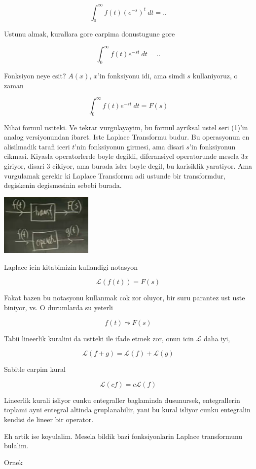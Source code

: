 \documentclass[12pt,fleqn]{article}
\begin{document}
\[ \int_0^{\infty} f(t)(e^{-s})^t \ dt = ..\]

Ustunu almak, kurallara gore carpima donustugune gore

\[ \int_0^{\infty} f(t)e^{-st} \ dt = ..\]

Fonksiyon neye esit? $A(x)$, $x$'in fonksiyonu idi, ama simdi $s$
kullaniyoruz, o zaman 

\[ \int_0^{\infty} f(t)e^{-st} \ dt = F(s)\]

Nihai formul ustteki. Ve tekrar vurgulayayim, bu formul ayriksal ustel seri
(1)'in analog versiyonundan ibaret. Iste Laplace Transformu budur. Bu
operasyonun en alisilmadik tarafi iceri $t$'nin fonksiyonun girmesi, ama
disari $s$'in fonksiyonun cikmasi. Kiyasla operatorlerde boyle degildi,
diferansiyel operatorunde mesela $3x$ giriyor, disari $3$ cikiyor, ama
burada isler boyle degil, bu karisiklik yaratiyor. Ama vurgulamak gerekir
ki Laplace Transformu adi ustunde bir transformdur, degiskenin degismesinin
sebebi burada. 

\includegraphics[height=3cm]{19_1.png}

Laplace icin kitabimizin kullandigi notasyon 

\[ \mathcal{L}(f(t)) = F(s) \]

Fakat bazen bu notasyonu kullanmak cok zor oluyor, bir suru parantez ust
uste biniyor, vs. O durumlarda su yeterli

\[ f(t) \leadsto F(s) \]

Tabii lineerlik kuralini da ustteki ile ifade etmek zor, onun icin
$\mathcal{L}$ daha iyi, 

\[ \mathcal{L}(f+g) = \mathcal{L}(f) + \mathcal{L}(g) \]

Sabitle carpim kural 

\[ \mathcal{L}(cf) = c \mathcal{L}(f)  \]

Lineerlik kurali isliyor cunku entegraller baglaminda dusunursek,
entegrallerin toplami ayni entegral altinda gruplanabilir, yani bu kural
isliyor cunku entegralin kendisi de lineer bir operator. 

Eh artik ise koyulalim. Mesela bildik bazi fonksiyonlarin Laplace
transformunu bulalim. 

Ornek
\end{document}
